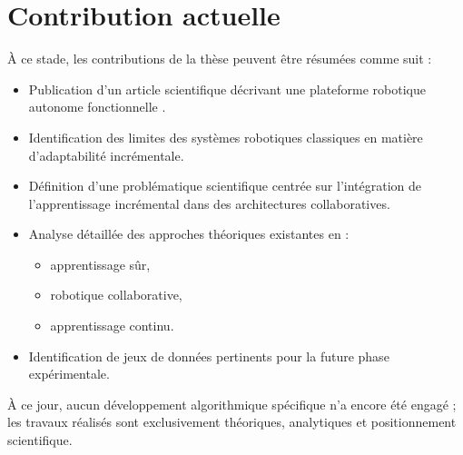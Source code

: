 \section{Contribution actuelle}

À ce stade, les contributions de la thèse peuvent être résumées comme suit :
\begin{itemize}
    \item Publication d’un article scientifique décrivant une plateforme robotique autonome fonctionnelle \cite{my_robot_paper}.
    \item Identification des limites des systèmes robotiques classiques en matière d’adaptabilité incrémentale.
    \item Définition d’une problématique scientifique centrée sur l’intégration de l’apprentissage incrémental dans des architectures collaboratives.
    \item Analyse détaillée des approches théoriques existantes en :
    \begin{itemize}
        \item apprentissage sûr,
        \item robotique collaborative,
        \item apprentissage continu.
    \end{itemize}
    \item Identification de jeux de données pertinents pour la future phase expérimentale.
\end{itemize}

À ce jour, aucun développement algorithmique spécifique n’a encore été engagé ; les travaux réalisés sont exclusivement théoriques, analytiques et positionnement scientifique.

